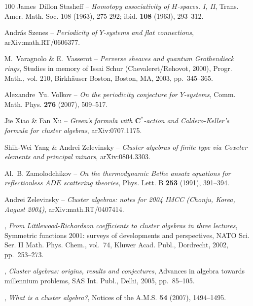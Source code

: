 \documentclass[brochure,12pt]{bourbaki}
\numberwithin{equation}{subsection}
\numberwithin{theorem}{section}
\begin{document}
\begin{thebibliography}{100}
{\sc James~Dillon Stasheff} -- \emph{Homotopy associativity of {$H$}-spaces. {I},
  {II}}, Trans. Amer. Math. Soc. 108 (1963), 275-292; ibid. \textbf{108}
  (1963), 293--312.
 
  \smallskip


{\sc Andr\'as Szenes} -- \emph{Periodicity of {$Y$}-systems and flat connections},
  arXiv:math.RT/0606377.
 
  \smallskip


{\sc M.~Varagnolo \& E.~Vasserot} -- \emph{Perverse sheaves and quantum {G}rothendieck
  rings}, Studies in memory of {I}ssai {S}chur ({C}hevaleret/{R}ehovot, 2000),
  Progr. Math., vol. 210, Birkh\"auser Boston, Boston, MA, 2003, pp.~345--365.
 
  \smallskip

{\sc Alexandre~Yu. Volkov} -- \emph{On the periodicity conjecture for {$Y$}-systems},
  Comm. Math. Phys. \textbf{276} (2007), 509--517.
 
  \smallskip


{\sc Jie Xiao \& Fan Xu} -- \emph{Green's formula with $\mathbf{C}^{*}$-action and
  {C}aldero-{K}eller's formula for cluster algebras}, arXiv:0707.1175.
 
  \smallskip


{\sc Shih-Wei Yang \& Andrei Zelevinsky} -- \emph{Cluster algebras of finite type via
  {C}oxeter elements and principal minors}, arXiv:0804.3303.
 
  \smallskip


{\sc Al.~B. Zamolodchikov} -- \emph{On the thermodynamic {B}ethe ansatz equations for
  reflectionless {$ADE$} scattering theories}, Phys. Lett. B \textbf{253}
  (1991), 391--394.
 
  \smallskip


{\sc Andrei Zelevinsky} -- \emph{{Cluster algebras: notes for 2004 IMCC (Chonju, Korea,
  August 2004)}}, arXiv:math.RT/0407414.
 
  \smallskip


\bysame, \emph{From {L}ittlewood-{R}ichardson coefficients to cluster
  algebras in three lectures}, Symmetric functions 2001: surveys of
  developments and perspectives, NATO Sci. Ser. II Math. Phys. Chem., vol.~74,
  Kluwer Acad. Publ., Dordrecht, 2002, pp.~253--273.
 
  \smallskip


\bysame, \emph{Cluster algebras: origins, results and conjectures}, Advances in
  algebra towards millennium problems, SAS Int. Publ., Delhi, 2005,
  pp.~85--105.
 
  \smallskip


\bysame, \emph{What is a cluster algebra?}, Notices of the A.M.S. \textbf{54}
  (2007), 1494--1495.

\end{thebibliography}
\end{document}
